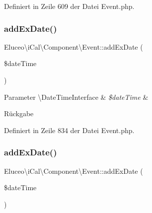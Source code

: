 Definiert in Zeile 609 der Datei Event.\+php.

\mbox{\label{class_eluceo_1_1i_cal_1_1_component_1_1_event_af5aeaa2d4977aff633e5d3d7b69e49e4}} 
\subsubsection{\texorpdfstring{add\+Ex\+Date()}{addExDate()}\hspace{0.1cm}{\footnotesize\ttfamily [1/3]}}
{\footnotesize\ttfamily Eluceo\textbackslash{}i\+Cal\textbackslash{}\+Component\textbackslash{}\+Event\+::add\+Ex\+Date (\begin{DoxyParamCaption}\item[{\textbackslash{}Date\+Time\+Interface}]{\$date\+Time }\end{DoxyParamCaption})}


\begin{DoxyParams}[1]{Parameter}
\textbackslash{}\+Date\+Time\+Interface & {\em \$date\+Time} & \\
\hline
\end{DoxyParams}
\begin{DoxyReturn}{Rückgabe}

\end{DoxyReturn}


Definiert in Zeile 834 der Datei Event.\+php.

\mbox{\label{class_eluceo_1_1i_cal_1_1_component_1_1_event_af5aeaa2d4977aff633e5d3d7b69e49e4}} 
\subsubsection{\texorpdfstring{add\+Ex\+Date()}{addExDate()}\hspace{0.1cm}{\footnotesize\ttfamily [2/3]}}
{\footnotesize\ttfamily Eluceo\textbackslash{}i\+Cal\textbackslash{}\+Component\textbackslash{}\+Event\+::add\+Ex\+Date (\begin{DoxyParamCaption}\item[{\textbackslash{}Date\+Time\+Interface}]{\$date\+Time }\end{DoxyParamCaption})}


